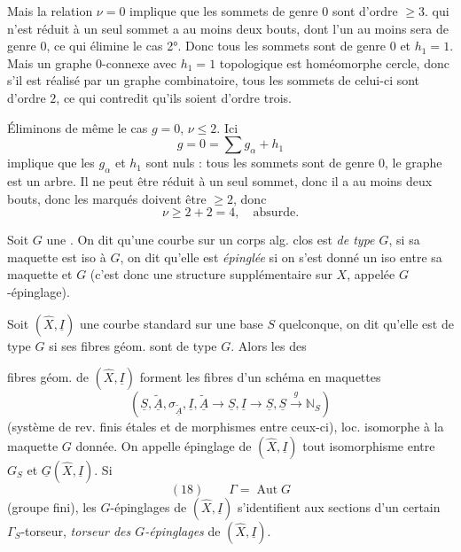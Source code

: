 \documentclass[11pt,a4paper]{article}
\begin{document}
Mais la relation $\nu = 0$ implique que les sommets de genre $0$ sont d'ordre $\geq 3$.    qui n'est réduit à un seul sommet  a au moins deux bouts, dont l'un au moins sera de genre $0$, ce qui élimine le cas 2°. Donc tous les sommets sont de genre $0$  et $h_{1} = 1$. Mais  un graphe  $0$-connexe avec $h_{1} = 1$   topologique est homéomorphe  cercle, donc s'il est réalisé par un graphe combinatoire, tous les sommets de celui-ci sont d'ordre $2$, ce qui contredit qu'ils soient d'ordre trois.

Éliminons de même le cas $g = 0$, $\nu \leq 2$. Ici
\[
g = 0 = \sum g_{\alpha} + h_{1}
\]
implique que les $g_{\alpha}$ et $h_{1}$ sont nuls : tous les sommets sont de genre $0$, le graphe est un arbre. Il ne peut être réduit à un seul sommet, donc il a au moins deux bouts, donc \struck{\ill{}} les   marqués doivent être $\geq 2$, donc \ill{}
\[
\nu \geq 2 + 2 = 4, \quad \text{absurde.}
\]

Soit $G$ une  . On dit qu'une   courbe  sur un corps alg. clos est \emph{de type $G$}, si sa maquette est iso à $G$, on dit qu'elle est \emph{épinglée} si on s'est donné un iso entre sa maquette et $G$ (c'est donc une structure supplémentaire sur $X$, appelée $G$-épinglage).

Soit $(\widehat{X}, \underline{I})$ une courbe standard sur une base $S$ quelconque, on dit qu'elle est de type $G$ si ses fibres géom. sont de type $G$. Alors les \struck{\ill{}}  des


fibres géom. de $(\widehat{X}, \underline{I})$ forment les fibres d'un schéma en maquettes 
\[
(\underline{S}, \underline{\widetilde{A}}, \sigma_{\underline{\widetilde{A}}}, \underline{I}, \underline{\widetilde{A}} \to \underline{S}, \underline{I} \to \underline{S}, \underline{S} \xrightarrow{g} \mathbb{N}_{S})
\]
(système de rev. finis étales  et de morphismes entre ceux-ci), loc. isomorphe à la maquette $G$ donnée. \struck{\ill{}} On appelle épinglage de $(\widehat{X}, \underline{I})$ tout isomorphisme entre $G_{S}$ et $\underline{G}(\widehat{X}, \underline{I})$. Si \struck{$\Gamma$}
\[
(18)\qquad \Gamma = \operatorname{Aut} G
\]
(groupe fini), les $G$-épinglages de $(\widehat{X}, \underline{I})$ s'identifient aux sections d'un certain $\Gamma_{S}$-torseur,   \emph{torseur des $G$-épinglages} de $(\widehat{X}, \underline{I})$.
\end{document}
